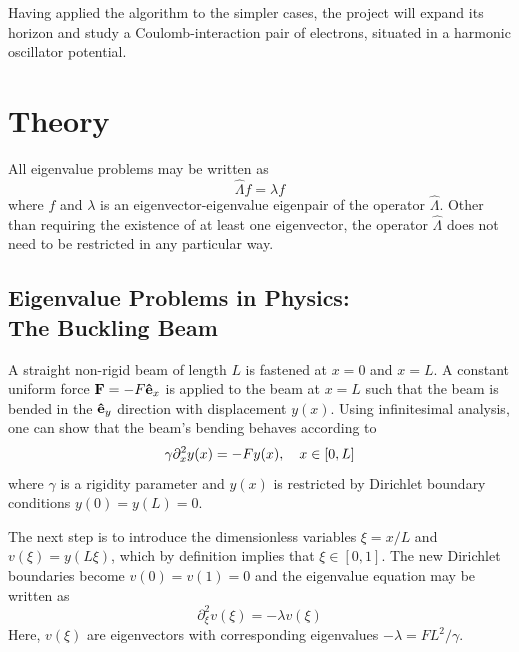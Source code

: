 \documentclass[reprint,english]{revtex4-1}
\begin{document}
Having applied the algorithm to the simpler cases, the project will expand its horizon and study a Coulomb-interaction pair of electrons, situated in a harmonic oscillator potential.
\newpage
\section{Theory}
All eigenvalue problems may be written as
\begin{equation}
\hat{\Lambda}f=\lambda f
\end{equation}
where \(f\) and \(\lambda\) is an eigenvector-eigenvalue eigenpair of the operator \(\hat{\Lambda}\). Other than requiring the existence of at least one eigenvector, the operator \(\hat{\Lambda}\) does not need to be restricted in any particular way.
\subsection{Eigenvalue Problems in Physics:\\The Buckling Beam}
A straight non-rigid beam of length \(L\) is fastened at \(x=0\) and \(x=L\). A constant uniform force \(\vb{F}=-F\vu{e}_x\) is applied to the beam at \(x=L\) such that the beam is bended in the \(\vu{e}_y\) direction with displacement \(y(x)\). Using infinitesimal analysis, one can show that the beam's bending behaves according to
\begin{equation}\label{eq:initial_buckling_beam}
\gamma\partial_x^2y(x)=-Fy(x)\qc x\in[0,L]
\end{equation}
where \(\gamma\) is a rigidity parameter and \(y(x)\) is restricted by Dirichlet boundary conditions \(y(0)=y(L)=0\).

The next step is to introduce the dimensionless variables \(\xi=x/L\) and \(v(\xi)=y(L\xi)\), which by definition implies that \(\xi\in[0,1]\). The new Dirichlet boundaries become \(v(0)=v(1)=0\) and the eigenvalue equation may be written as
\begin{equation}\label{eq:dimless_buckling_beam}
\partial_{\xi}^2v(\xi)=-\lambda v(\xi)
\end{equation}
Here, \(v(\xi)\) are eigenvectors with corresponding eigenvalues \(-\lambda=FL^2/\gamma\).
\end{document}
